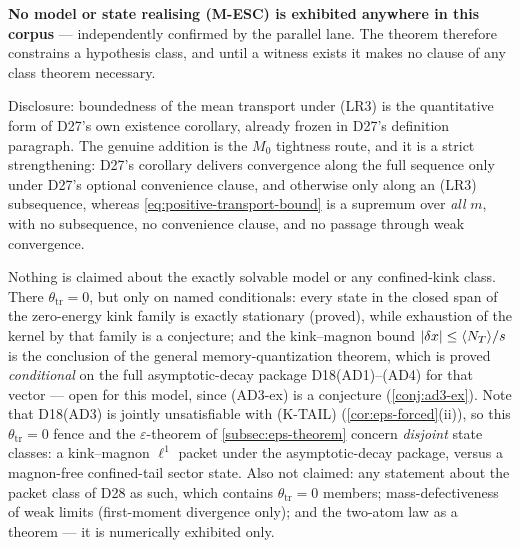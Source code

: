 \begin{scope}
\label{scope:escape-obstruction}
\textbf{No model or state realising (M-ESC) is exhibited anywhere in this
corpus} --- independently confirmed by the parallel lane. The theorem
therefore constrains a hypothesis class, and until a witness exists it makes no
clause of any class theorem necessary.

Disclosure: boundedness of the mean transport under (LR3) is the quantitative
form of D27's own existence corollary, already frozen in D27's definition
paragraph. The genuine addition is the $M_0$ tightness route, and it is a
strict strengthening: D27's corollary delivers convergence along the full
sequence only under D27's optional convenience clause, and otherwise only along
an (LR3) subsequence, whereas \eqref{eq:positive-transport-bound} is a supremum
over \emph{all} $m$, with no subsequence, no convenience clause, and no passage
through weak convergence.

Nothing is claimed about the exactly solvable model or any confined-kink class.
There $\theta_{\mathrm{tr}}=0$, but only on named conditionals: every state in
the closed span of the zero-energy kink family is exactly stationary (proved),
while exhaustion of the kernel by that family is a conjecture; and the
kink--magnon bound $\lvert \delta x\rvert\le\langle N_T\rangle/s$ is the conclusion of the
general memory-quantization theorem, which is proved \emph{conditional} on the
full asymptotic-decay package D18(AD1)--(AD4) for that vector --- open for this
model, since (AD3-ex) is a conjecture (\cref{conj:ad3-ex}). Note that D18(AD3)
is jointly unsatisfiable with (K-TAIL) (\cref{cor:eps-forced}(ii)), so this
$\theta_{\mathrm{tr}}=0$ fence and the $\varepsilon$-theorem of
\cref{subsec:eps-theorem} concern \emph{disjoint} state classes: a
kink--magnon $\ell^1$ packet under the asymptotic-decay package, versus a
magnon-free confined-tail sector state. Also not claimed: any statement about
the packet class of D28 as such, which contains $\theta_{\mathrm{tr}}=0$
members; mass-defectiveness of weak limits (first-moment divergence only); and
the two-atom law as a theorem --- it is numerically exhibited only.
\end{scope}

